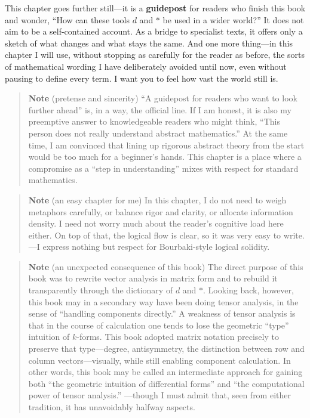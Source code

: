 \documentclass[a4paper,12pt,openany]{book}
\begin{document}
This chapter goes further still—it is a \textbf{guidepost} for readers
who finish this book and wonder, ``How can these tools \(d\) and
\(\ast\) be used in a wider world?'' It does not aim to be a
self-contained account. As a bridge to specialist texts, it offers only
a sketch of what changes and what stays the same. And one more
thing—in this chapter I will use, without stopping as carefully for
the reader as before, the sorts of mathematical wording I have
deliberately avoided until now, even without pausing to define every
term. I want you to feel how vast the world still is.

\begin{quote}
\textbf{Note} (pretense and sincerity) ``A guidepost for readers who
want to look further ahead'' is, in a way, the official line. If I am
honest, it is also my preemptive answer to knowledgeable readers who
might think, ``This person does not really understand abstract
mathematics.'' At the same time, I am convinced that lining up rigorous
abstract theory from the start would be too much for a beginner's hands.
This chapter is a place where a compromise as a ``step in
understanding'' mixes with respect for standard mathematics.
\end{quote}

\begin{quote}
\textbf{Note} (an easy chapter for me) In this chapter, I do not need to
weigh metaphors carefully, or balance rigor and clarity, or allocate
information density. I need not worry much about the reader's cognitive
load here either. On top of that, the logical flow is clear, so it was
very easy to write. —I express nothing but respect for Bourbaki-style
logical solidity.
\end{quote}

\begin{quote}
\textbf{Note} (an unexpected consequence of this book) The direct
purpose of this book was to rewrite vector analysis in matrix form and
to rebuild it transparently through the dictionary of \(d\) and
\(\ast\). Looking back, however, this book may in a secondary way have
been doing tensor analysis, in the sense of ``handling components
directly.'' A weakness of tensor analysis is that in the course of
calculation one tends to lose the geometric ``type'' intuition of
\(k\)-forms. This book adopted matrix notation precisely to preserve
that type—degree, antisymmetry, the distinction between row and column
vectors—visually, while still enabling component calculation. In other
words, this book may be called an intermediate approach for gaining both
``the geometric intuition of differential forms'' and ``the
computational power of tensor analysis.'' —though I must admit that,
seen from either tradition, it has unavoidably halfway aspects.
\end{quote}
\end{document}
